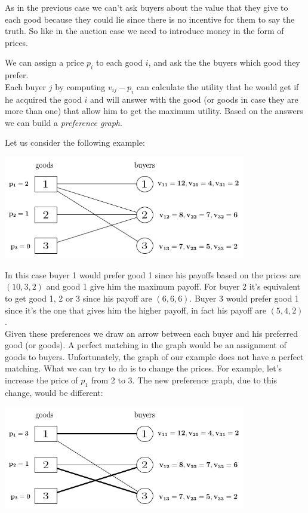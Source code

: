 \documentclass{article}
\begin{document}
As in the previous case we can't ask buyers about the value that they give to each good because they could lie since there is no incentive for them to say the truth. So like in the auction case we need to introduce money in the form of prices.

We can assign a price $p_i$ to each good $i$, and ask the the buyers which good they prefer.\\
Each buyer $j$ by computing $v_{ij}-p_i$ can calculate the utility that he would get if he acquired the good $i$ and will answer with the good (or goods in case they are more than one) that allow him to get the maximum utility. Based on the answers we can build a \textit{preference graph}.

Let us consider the following example:

\centerline{
\includegraphics[width=300pt]{img12.jpg}}

In this case buyer 1 would prefer good 1 since his payoffs based on the prices are $(10,3,2)$ and good 1 give him the maximum payoff. For buyer 2 it's equivalent to get good 1, 2 or 3 since his payoff are $(6,6,6)$. Buyer 3 would prefer good 1 since it's the one that gives him the higher payoff, in fact his payoff are $(5,4,2)$.\\
Given these preferences we draw an arrow between each buyer and his preferred good (or goods). A perfect matching in the graph would be an assignment of goods to buyers. Unfortunately, the graph of our example does not have a perfect matching. What we can try to do is to change the prices. For example, let's increase the price of $p_1$ from 2 to 3. The new preference graph, due to this change, would be different:

\centerline{
\includegraphics[width=300pt]{img13.jpg}}
\end{document}
